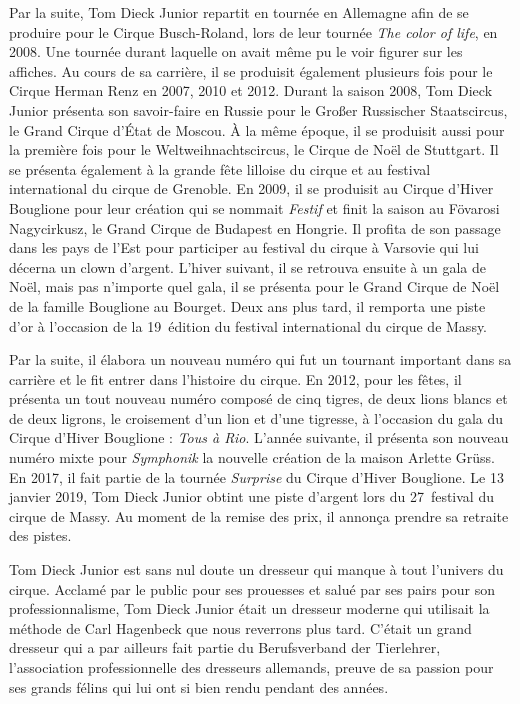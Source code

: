 Par la suite, Tom Dieck Junior repartit en tournée en Allemagne afin de se produire pour le Cirque Busch-Roland, lors de leur tournée \textit{The color of life}, en 2008. Une tournée durant laquelle on avait même pu le voir figurer sur les affiches. Au cours de sa carrière, il se produisit également plusieurs fois pour le Cirque Herman Renz en 2007, 2010 et 2012. Durant la saison 2008, Tom Dieck Junior présenta son savoir-faire en Russie pour le Großer Russischer Staatscircus, le Grand Cirque d'État de Moscou. À la même époque, il se produisit aussi pour la première fois pour le Weltweihnachtscircus, le Cirque de Noël de Stuttgart. Il se présenta également à la grande fête lilloise du cirque et au festival international du cirque de Grenoble. En 2009, il se produisit au Cirque d'Hiver Bouglione pour leur création qui se nommait \textit{Festif} et finit la saison au Fövarosi Nagycirkusz, le Grand Cirque de Budapest en Hongrie. Il profita de son passage dans les pays de l'Est pour participer au festival du cirque à Varsovie qui lui décerna un clown d'argent. L'hiver suivant, il se retrouva ensuite à un gala de Noël, mais pas n'importe quel gala, il se présenta pour le Grand Cirque de Noël de la famille Bouglione au Bourget. Deux ans plus tard, il remporta une piste d'or à l'occasion de la 19\ieme~édition du festival international du cirque de Massy.

Par la suite, il élabora un nouveau numéro qui fut un tournant important dans sa carrière et le fit entrer dans l'histoire du cirque. En 2012, pour les fêtes, il présenta un tout nouveau numéro composé de cinq tigres, de deux lions blancs et de deux ligrons, le croisement d’un lion et d’une tigresse, à l'occasion du gala du Cirque d'Hiver Bouglione : \textit{Tous à Rio}. L'année suivante, il présenta son nouveau numéro mixte pour \textit{Symphonik} la nouvelle création de la maison Arlette Grüss. En 2017, il fait partie de la tournée \textit{Surprise} du Cirque d'Hiver Bouglione. Le 13 janvier 2019, Tom Dieck Junior obtint une piste d’argent lors du 27\ieme~festival du cirque de Massy. Au moment de la remise des prix, il annonça prendre sa retraite des pistes.

Tom Dieck Junior est sans nul doute un dresseur qui manque à tout l'univers du cirque. Acclamé par le public pour ses prouesses et salué par ses pairs pour son professionnalisme, Tom Dieck Junior était un dresseur moderne qui utilisait la méthode de Carl Hagenbeck que nous reverrons plus tard. C'était un grand dresseur qui a par ailleurs fait partie du Berufsverband der Tierlehrer, l'association professionnelle des dresseurs allemands, preuve de sa passion pour ses grands félins qui lui ont si bien rendu pendant des années.

